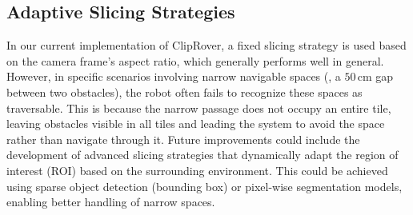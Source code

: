 
\subsection{Adaptive Slicing Strategies}
\vspace{-1mm}
In our current implementation of ClipRover, a fixed slicing strategy is used based on the camera frame's aspect ratio, which generally performs well in general. However, in specific scenarios involving narrow navigable spaces (\eg, a $50$\,cm gap between two obstacles), the robot often fails to recognize these spaces as traversable. This is because the narrow passage does not occupy an entire tile, leaving obstacles visible in all tiles and leading the system to avoid the space rather than navigate through it. Future improvements could include the development of advanced slicing strategies that dynamically adapt the region of interest (ROI) based on the surrounding environment. This could be achieved using sparse object detection (bounding box) or pixel-wise segmentation models, enabling better handling of narrow spaces.


